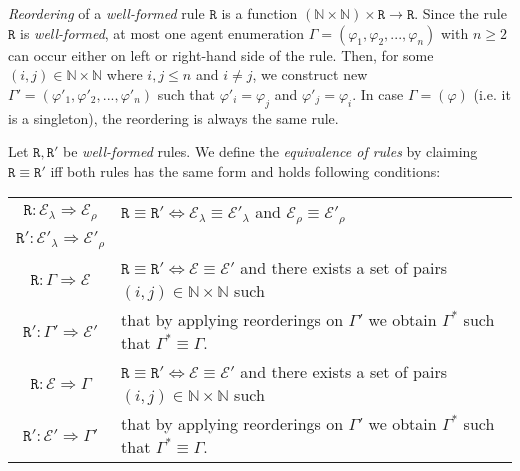 \documentclass{entcs}
\renewcommand{\~}[0]{\texttildelow}
\begin{document}
\begin{defn}
\emph{Reordering} of a \emph{well-formed} rule $\mathtt{R}$ is a function $(\mathbb{N} \times \mathbb{N}) \times \mathtt{R} \rightarrow \mathtt{R}$. Since the rule $\mathtt{R}$ is \emph{well-formed}, at most one agent enumeration $\Gamma = (\varphi_1, \varphi_2, ..., \varphi_n)$ with $n \geq 2$ can occur either on left or right-hand side of the rule. Then, for some $(i, j) \in \mathbb{N} \times \mathbb{N}$ where $ i,j \leq n $ and $ i \neq j $, we construct new $\Gamma' = (\varphi'_1, \varphi'_2, ..., \varphi'_n)$ such that $\varphi'_i = \varphi_j$ and $\varphi'_j = \varphi_i$. In case $\Gamma = (\varphi)$ (i.e. it is a singleton), the reordering is always the same rule.
\end{defn}

\begin{defn}
Let $\mathtt{R},\mathtt{R}'$ be \emph{well-formed} rules. We define the \emph{equivalence of rules} by claiming $\mathtt{R} \equiv \mathtt{R}'$ iff both rules has the same form and holds following conditions:

\begin{center}
\begin{tabular}{c@{\hskip 1in}l}
	$\mathtt{R}: \mathcal{E}_\lambda \Rightarrow \mathcal{E}_\rho$ & $\mathtt{R} \equiv \mathtt{R}' \Leftrightarrow \mathcal{E}_\lambda \equiv \mathcal{E}'_\lambda$ and $\mathcal{E}_\rho \equiv \mathcal{E}'_\rho$ \\
	$\mathtt{R}': \mathcal{E}'_\lambda \Rightarrow \mathcal{E}'_\rho$ &  \\
	\hline
	$\mathtt{R}: \Gamma \Rightarrow \mathcal{E}$ & $\mathtt{R} \equiv \mathtt{R}' \Leftrightarrow \mathcal{E} \equiv \mathcal{E}'$ and there exists a set of pairs $(i,j) \in \mathbb{N} \times \mathbb{N}$ such \\
	$\mathtt{R}': \Gamma' \Rightarrow \mathcal{E}'$ & that by applying reorderings on $\Gamma'$ we obtain $\Gamma^*$ such that $\Gamma^* \equiv \Gamma$.  \\
	\hline
	$\mathtt{R}: \mathcal{E} \Rightarrow \Gamma $ & $\mathtt{R} \equiv \mathtt{R}' \Leftrightarrow \mathcal{E} \equiv \mathcal{E}'$ and there exists a set of pairs $(i,j) \in \mathbb{N} \times \mathbb{N}$ such \\
	$\mathtt{R}': \mathcal{E}' \Rightarrow \Gamma' $ & that by applying reorderings on $\Gamma'$ we obtain $\Gamma^*$ such that $\Gamma^* \equiv \Gamma$.  \\
\end{tabular}
\end{center}

\end{defn}
\end{document}
